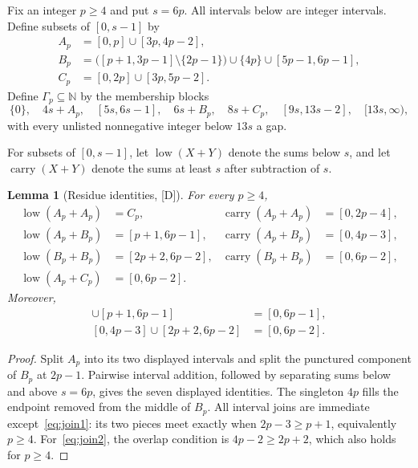 \documentclass[11pt]{article}
\newtheorem{lemma}[theorem]{Lemma}
\theoremstyle{definition}
\theoremstyle{remark}
\newcommand{\N}{\mathbb{N}}
\begin{document}
Fix an integer $p\ge4$ and put $s=6p$. All intervals below are integer intervals. Define subsets
of $[0,s-1]$ by
\begin{align*}
A_p&=[0,p]\cup[3p,4p-2],\\
B_p&=\bigl([p+1,3p-1]\setminus\{2p-1\}\bigr)
      \cup\{4p\}\cup[5p-1,6p-1],\\
C_p&=[0,2p]\cup[3p,5p-2].
\end{align*}
Define $\Gamma_p\subseteq\N$ by the membership blocks
\begin{equation}\label{eq:familyblocks}
\{0\},\quad 4s+A_p,\quad [5s,6s-1],\quad 6s+B_p,\quad
8s+C_p,\quad[9s,13s-2],\quad[13s,\infty),
\end{equation}
with every unlisted nonnegative integer below $13s$ a gap.

For subsets of $[0,s-1]$, let $\operatorname{low}(X+Y)$ denote the sums below $s$, and let
$\operatorname{carry}(X+Y)$ denote the sums at least $s$ after subtraction of $s$.

\begin{lemma}[Residue identities, {[D]}]\label{lem:residues}
For every $p\ge4$,
\begin{align*}
\operatorname{low}(A_p+A_p)&=C_p,&
\operatorname{carry}(A_p+A_p)&=[0,2p-4],\\
\operatorname{low}(A_p+B_p)&=[p+1,6p-1],&
\operatorname{carry}(A_p+B_p)&=[0,4p-3],\\
\operatorname{low}(B_p+B_p)&=[2p+2,6p-2],&
\operatorname{carry}(B_p+B_p)&=[0,6p-2],\\
\operatorname{low}(A_p+C_p)&=[0,6p-2].&&
\end{align*}
Moreover,
\begin{align}
[0,2p-4]\cup[p+1,6p-1]&=[0,6p-1],\label{eq:join1}\\
[0,4p-3]\cup[2p+2,6p-2]&=[0,6p-2].\label{eq:join2}
\end{align}
\end{lemma}
\begin{proof}
Split $A_p$ into its two displayed intervals and split the punctured component of $B_p$ at
$2p-1$. Pairwise interval addition, followed by separating sums below and above $s=6p$, gives the
seven displayed identities. The singleton $4p$ fills the endpoint removed from the middle of
$B_p$. All interval joins are immediate except~\eqref{eq:join1}: its two pieces meet exactly when
$2p-3\ge p+1$, equivalently $p\ge4$. For~\eqref{eq:join2}, the overlap condition is
$4p-2\ge2p+2$, which also holds for $p\ge4$.
\end{proof}
\end{document}
